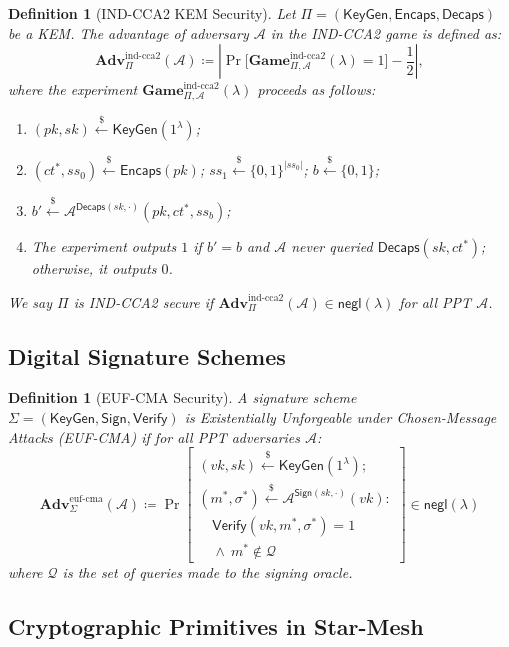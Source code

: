 \documentclass[11pt,a4paper]{article}
\newtheorem{definition}[theorem]{Definition}
\theoremstyle{remark}
\theoremstyle{plain}
\newcommand{\negl}{\mathsf{negl}}
\newcommand{\Adv}{\mathbf{Adv}}
\newcommand{\PGame}{\mathbf{Game}}
\newcommand{\calA}{\mathcal{A}}
\newcommand{\bits}{\{0,1\}}
\newcommand{\getsr}{\stackrel{\$}{\leftarrow}}
\newcommand{\Encaps}{\mathsf{Encaps}}
\newcommand{\Decaps}{\mathsf{Decaps}}
\newcommand{\Sign}{\mathsf{Sign}}
\newcommand{\Verify}{\mathsf{Verify}}
\newcommand{\KeyGen}{\mathsf{KeyGen}}
\begin{document}
\begin{definition}[IND-CCA2 KEM Security]
Let $\Pi = (\KeyGen, \Encaps, \Decaps)$ be a KEM.  The advantage of adversary $\calA$ in the
IND-CCA2 game is defined as:
\[
  \Adv^{\mathrm{ind\text{-}cca2}}_{\Pi}(\calA) \coloneqq \left| \Pr\bigl[\PGame^{\mathrm{ind\text{-}cca2}}_{\Pi,\calA}(\lambda) = 1\bigr] - \frac{1}{2} \right|,
\]
where the experiment $\PGame^{\mathrm{ind\text{-}cca2}}_{\Pi,\calA}(\lambda)$ proceeds as follows:
\begin{enumerate}
  \item $(pk, sk) \getsr \KeyGen(1^\lambda)$;
  \item $(ct^*, ss_0) \getsr \Encaps(pk)$; $ss_1 \getsr \bits^{|ss_0|}$; $b \getsr \bits$;
  \item $b' \getsr \calA^{\Decaps(sk,\cdot)}(pk, ct^*, ss_b)$;
  \item The experiment outputs $1$ if $b' = b$ and $\calA$ never queried $\Decaps(sk, ct^*)$; otherwise, it outputs $0$.
\end{enumerate}
We say $\Pi$ is IND-CCA2 secure if $\Adv^{\mathrm{ind\text{-}cca2}}_{\Pi}(\calA) \in \negl(\lambda)$ for all PPT $\calA$.
\end{definition}

\subsection{Digital Signature Schemes}

\begin{definition}[EUF-CMA Security]
A signature scheme $\Sigma = (\KeyGen, \Sign, \Verify)$ is Existentially Unforgeable under
Chosen-Message Attacks (EUF-CMA) if for all PPT adversaries $\calA$:
\[
  \Adv^{\mathrm{euf\text{-}cma}}_{\Sigma}(\calA) \coloneqq \Pr\left[
  \begin{array}{l}
    (vk, sk) \getsr \KeyGen(1^\lambda); \\
    (m^*, \sigma^*) \getsr \calA^{\Sign(sk,\cdot)}(vk) : \\
    \quad \Verify(vk, m^*, \sigma^*) = 1 \\
    \quad \wedge\ m^* \notin \mathcal{Q}
  \end{array}
  \right] \in \negl(\lambda)
\]
where $\mathcal{Q}$ is the set of queries made to the signing oracle.
\end{definition}

\subsection{Cryptographic Primitives in Star-Mesh}
\end{document}
